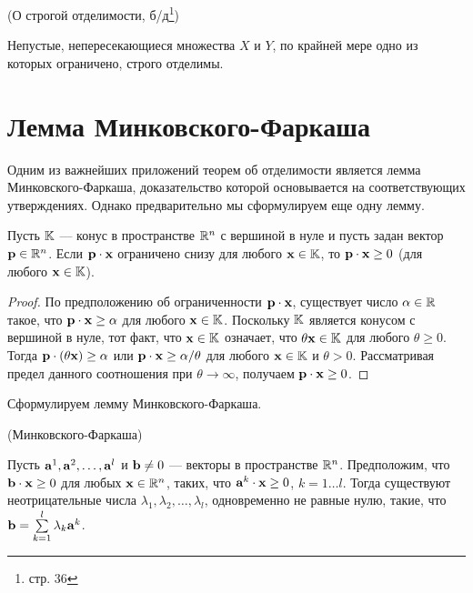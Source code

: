 \begin{teo}(О строгой отделимости, б/д\/\footnote{\cite{Kapustin:2001} стр. 36})

Непустые, непересекающиеся множества $X$ и $Y$, по крайней мере одно
из которых ограничено, строго отделимы. \end{teo}

\section{Лемма Минковского-Фаркаша}

Одним из важнейших приложений теорем об отделимости является лемма
Минковского-Фаркаша, доказательство которой основывается на
соответствующих утверждениях. Однако предварительно мы сформулируем
еще одну лемму.

\begin{lem}

Пусть $\mathbb{K}$ --- конус в пространстве $\mathbb{R}^n$ с
вершиной в нуле и пусть задан вектор $\mathbf{p} \in \mathbb{R}^n$. Если $\mathbf{p}
\cdot \mathbf{x}$ ограничено снизу для любого $\mathbf{x} \in \mathbb{K}$, то
$\mathbf{p} \cdot \mathbf{x} \geq 0$ (для любого $\mathbf{x} \in \mathbb{K}$).
\end{lem}


\begin{proof}

По предположению об ограниченности $\mathbf{p} \cdot \mathbf{x}$, существует
число $\alpha \in \mathbb{R}$ такое, что $\mathbf{p} \cdot \mathbf{x} \geq \alpha$
для любого $\mathbf{x} \in \mathbb{K}$. Поскольку $\mathbb{K}$ является конусом
с вершиной в нуле, тот факт, что $\mathbf{x} \in \mathbb{K}$ означает, что
$\theta \mathbf{x} \in \mathbb{K}$ для любого $\theta \geq 0$. Тогда $\mathbf{p}
\cdot (\theta \mathbf{x}) \geq \alpha$ или $\mathbf{p} \cdot \mathbf{x} \geq
\alpha / \theta$ для любого $\mathbf{x} \in \mathbb{K}$ и $\theta > 0$.
Рассматривая предел данного соотношения при $\theta \rightarrow
\infty$, получаем $\mathbf{p} \cdot \mathbf{x} \geq 0$.
\end{proof}


Сформулируем лемму Минковского-Фаркаша.

\begin{lem}(Минковского-Фаркаша)  \label{lem:MinkFarcas}

Пусть $\mathbf{a}^1, \mathbf{a}^2, \ldots, \mathbf{a}^l$ и $\mathbf{b}\neq0$ ---
векторы в пространстве $\mathbb{R}^n$. Предположим, что $\mathbf{b} \cdot \mathbf{x}
\geq 0$ для любых $\mathbf{x} \in \mathbb{R}^n$, таких, что $\mathbf{a}^k \cdot
\mathbf{x} \geq 0$, $k=1 \ldots l$. Тогда существуют неотрицательные
числа $\lambda_1, \lambda_2, \ldots, \lambda_l$, одновременно не
равные нулю, такие, что $\mathbf{b}=\sum\limits_{k=1}^l{\lambda_k
\mathbf{a}^k}$.
\end{lem}

